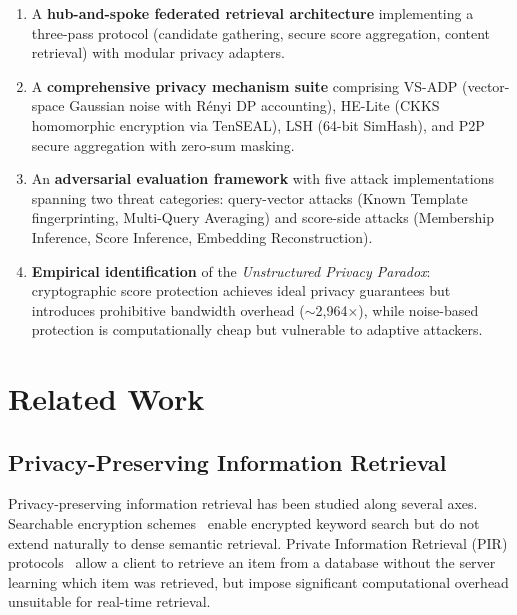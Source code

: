 \documentclass[conference]{IEEEtran}
\begin{document}
\begin{enumerate}
    \item A \textbf{hub-and-spoke federated retrieval architecture} implementing a three-pass protocol (candidate gathering, secure score aggregation, content retrieval) with modular privacy adapters.
    
    \item A \textbf{comprehensive privacy mechanism suite} comprising VS-ADP (vector-space Gaussian noise with R\'{e}nyi DP accounting), HE-Lite (CKKS homomorphic encryption via TenSEAL), LSH (64-bit SimHash), and P2P secure aggregation with zero-sum masking.
    
    \item An \textbf{adversarial evaluation framework} with five attack implementations spanning two threat categories: query-vector attacks (Known Template fingerprinting, Multi-Query Averaging) and score-side attacks (Membership Inference, Score Inference, Embedding Reconstruction).
    
    \item \textbf{Empirical identification} of the \textit{Unstructured Privacy Paradox}: cryptographic score protection achieves ideal privacy guarantees but introduces prohibitive bandwidth overhead ($\sim$2,964$\times$), while noise-based protection is computationally cheap but vulnerable to adaptive attackers.
\end{enumerate}

\section{Related Work}
\label{sec:related}

\subsection{Privacy-Preserving Information Retrieval}

Privacy-preserving information retrieval has been studied along several axes. Searchable encryption schemes~\cite{song2000practical,curtmola2006searchable} enable encrypted keyword search but do not extend naturally to dense semantic retrieval. Private Information Retrieval (PIR) protocols~\cite{chor1995private} allow a client to retrieve an item from a database without the server learning which item was retrieved, but impose significant computational overhead unsuitable for real-time retrieval.
\end{document}
